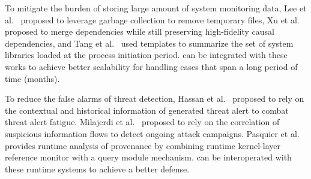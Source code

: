 To mitigate the burden of storing large amount of system monitoring data, 
Lee et al.~\cite{loggc} proposed to leverage garbage collection to remove temporary files,
Xu et al.~\cite{reduction} proposed to merge dependencies while still preserving high-fidelity causal dependencies,
and Tang et al.~\cite{reduction2} used templates to summarize the set of system libraries loaded at the process initiation period.
\tool can be 
integrated with these works to achieve better scalability for handling cases that span a long period of time (\eg months).

To reduce the false alarms of threat detection, Hassan et al.~\cite{hassan2019nodoze} proposed to rely on the contextual and historical information of generated threat alert to combat threat alert fatigue.
Milajerdi et al.~\cite{HOLMES} proposed to rely on the correlation of suspicious information flows to detect ongoing attack campaigns.
Pasquier et al.~\cite{pasquier2018runtime} provides runtime analysis of provenance by combining runtime kernel-layer reference monitor with a query module mechanism. 
\tool can be interoperated with these runtime systems to achieve a better defense.







